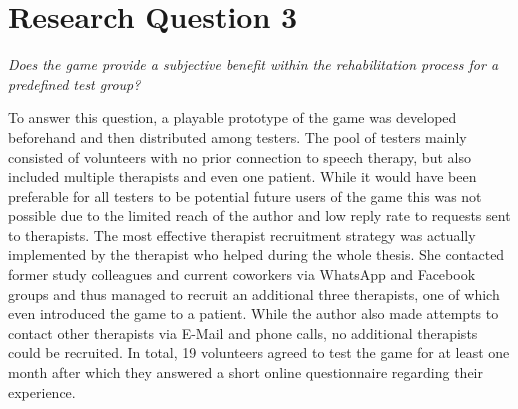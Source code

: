 \documentclass[draft,final]{vutinfth} %
\begin{document}
\section{Research Question 3}
\begin{center}
\emph{Does the game provide a subjective benefit within the rehabilitation process for a predefined test group?}
\end{center} 

To answer this question, a playable prototype of the game was developed beforehand and then distributed among testers. The pool of testers mainly consisted of volunteers with no prior connection to speech therapy, but also included multiple therapists and even one patient. While it would have been preferable for all testers to be potential future users of the game this was not possible due to the limited reach of the author and low reply rate to requests sent to therapists. The most effective therapist recruitment strategy was actually implemented by the therapist who helped during the whole thesis. She contacted former study colleagues and current coworkers via WhatsApp and Facebook groups and thus managed to recruit an additional three therapists, one of which even introduced the game to a patient. While the author also made attempts to contact other therapists via E-Mail and phone calls, no additional therapists could be recruited. In total, 19 volunteers agreed to test the game for at least one month after which they answered a short online questionnaire regarding their experience. \\
\end{document}
